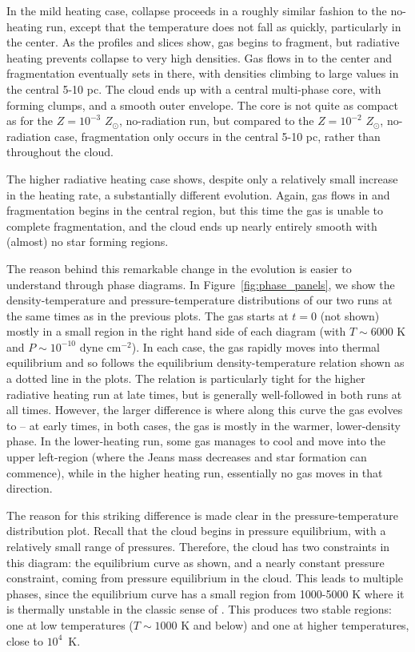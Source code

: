 \documentclass[useAMS,usenatbib]{mn2e}
\begin{document}
In the mild heating case, collapse proceeds in a roughly similar fashion to the no-heating run, except that the temperature does not fall as quickly, particularly in the center. As the profiles and slices show, gas begins to fragment, but radiative heating prevents collapse to very high densities. Gas flows in to the center and fragmentation eventually sets in there, with densities climbing to large values in the central 5-10 pc. The cloud ends up with a central multi-phase core, with forming clumps, and a smooth outer envelope. The core is not quite as compact as for the $Z=10^{-3}$ $Z_\odot$, no-radiation run, but compared to the $Z=10^{-2}$ $Z_\odot$, no-radiation case, fragmentation only occurs in the central 5-10 pc, rather than throughout the cloud.

The higher radiative heating case shows, despite only a relatively small increase in the heating rate, a substantially different evolution. Again, gas flows in and fragmentation begins in the central region, but this time the gas is unable to complete fragmentation, and the cloud ends up nearly entirely smooth with (almost) no star forming regions.

The reason behind this remarkable change in the evolution is easier to understand through phase diagrams.  In Figure~\ref{fig:phase_panels}, we show the density-temperature
and pressure-temperature distributions of our two runs at the same times as in the previous plots.  The gas starts at $t=0$ (not shown) mostly in a
small region in the right hand side of each diagram (with $T \sim 6000$ K and $P \sim 10^{-10}$ dyne cm$^{-2}$).  In each case, the gas rapidly moves
into thermal equilibrium and so follows the equilibrium density-temperature relation shown as a dotted line in the plots. The relation is particularly
tight for the higher radiative heating run at late times, but is generally well-followed in both runs at all times. However, the larger difference is
where along this curve the gas evolves to -- at early times, in both cases, the gas is mostly in the warmer, lower-density phase. In the lower-heating
run, some gas manages to cool and move into the upper left-region (where the Jeans mass decreases and star formation can commence), while in the higher
heating run, essentially no gas moves in that direction.  

The reason for this striking difference is made clear in the pressure-temperature distribution plot.  Recall that the cloud begins in pressure equilibrium, with a relatively small range of pressures.  Therefore, the cloud has two constraints in this diagram: the equilibrium curve as shown, and a nearly constant pressure constraint, coming from pressure equilibrium in the cloud.  This leads to multiple phases, since the equilibrium curve has a small region from 1000-5000 K where it is thermally unstable in the classic sense of \citet{Field1965}.  This produces two stable regions: one at low temperatures ($T \sim 1000$ K and below) and one at higher temperatures, close to $10^4$~K.   
\end{document}
